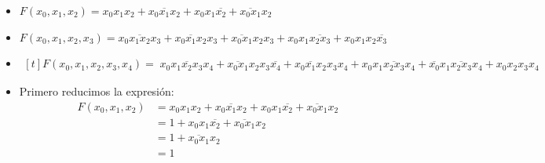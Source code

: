 \documentclass[answers]{exam}
\begin{document}
\begin{questions}
  \begin{itemize}
    \item
          \begin{math}
            F(x_{0}, x_{1}, x_{2}) = x_{0}x_{1}x_{2} + \overline{x_{0}x_{1}x_{2}} +%
            x_{0}x_{1}\overline{x_{2}} + \overline{x_{0}x_{1}}x_{2}%
          \end{math}
    \item
          \begin{math}
            F(x_{0}, x_{1}, x_{2}, x_{3}) = \overline{x_{0}x_{1}x_{2}x_{3}} +%
            \overline{x_{0}x_{1}x_{2}}x_{3} + \overline{x_{0}x_{1}}x_{2}x_{3} +%
            x_{0}x_{1}\overline{x_{2}x_{3}} + x_{0}x_{1}x_{2}\overline{x_{3}}
          \end{math}
    \item
          \begin{math}
            \begin{aligned}[t]
              F(x_{0}, x_{1}, x_{2}, x_{3}, x_{4}) =\;
              \overline{x_{0}x_{1}x_{2}x_{3}x_{4}} +
              \overline{x_{0}x_{1}}x_{2}x_{3}\overline{x_{4}} +
              x_{0}\overline{x_{1}}x_{2}x_{3}x_{4}
              + x_{0}x_{1}\overline{x_{2}x_{3}}x_{4}
              + \overline{x_{0}}x_{1}\overline{x_{2}x_{3}}x_{4}
              + x_{0}x_{2}x_{3}x_{4}
            \end{aligned}
          \end{math}
  \end{itemize}
  \begin{solution}
    \begin{itemize}
      \item Primero reducimos la expresión:
            \begin{align*}
              F(x_{0}, x_{1}, x_{2})
              &= x_{0}x_{1}x_{2} + \overline{x_{0} x_{1}x_{2}} +
                x_{0}x_{1}\overline{x_{2}} + \overline{x_{0}x_{1}}x_{2} \\
              &= 1 + x_{0}x_{1}\overline{x_{2}} +
                \overline{x_{0}x_{1}}x_{2} \tag{por Complemento} \\
              &= 1 + \overline{x_{0}x_{1}}x_{2}
                \tag{por Aniquilación} \\
              &= 1 \tag{por Aniquilación}
            \end{align*}

\end{itemize}
\end{solution}
\end{questions}
\end{document}
